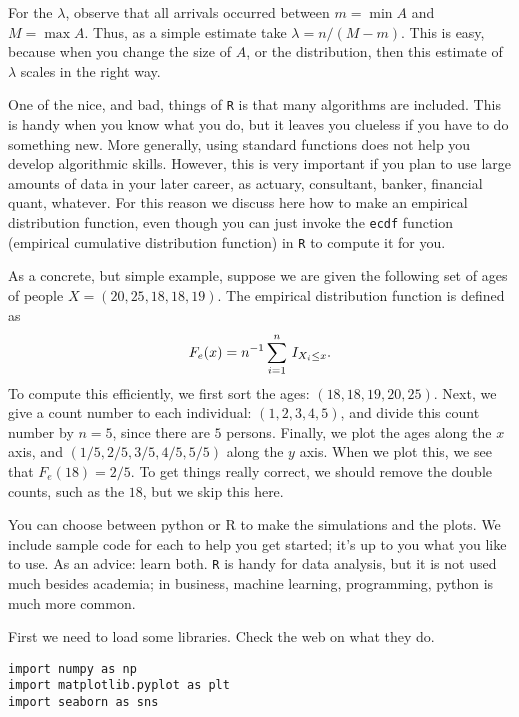 \documentclass[assignments]{subfiles}
\begin{document}
For the \(\lambda\), observe that all arrivals occurred between \(m= \min A\) and \(M=\max A\). Thus, as a simple estimate take \(\lambda = n/(M-m)\). This is easy, because when you change the size of \(A\), or the distribution, then this estimate of \(\lambda\) scales in the right way.


One of the nice, and bad, things of \texttt{R} is that many algorithms are included.
This is handy when you know what you do, but it leaves you clueless  if you have to do something new.
More generally, using standard functions does not help you develop algorithmic skills.
However, this is very important if you plan to use large amounts of data in your later career, as actuary, consultant, banker, financial quant, whatever.
For this reason we discuss here how to make an empirical distribution function, even though you can just invoke the \texttt{ecdf} function (empirical cumulative distribution function) in \texttt{R} to compute it for you.

As a concrete, but simple example, suppose we are given the following set of ages of people \(X = (20, 25, 18, 18, 19)\). The empirical distribution function is defined as
\begin{equation*}
F_e(x) = n^{-1}\sum_{i=1}^n \,I_{X_i\leq x}.
\end{equation*}
To compute this efficiently, we first sort the ages: \((18, 18, 19, 20, 25)\). Next, we give a count number to each individual: \((1,2,3,4,5)\), and divide this count number by \(n=5\), since there are \(5\) persons. Finally, we plot the ages along the \(x\) axis, and \((1/5, 2/5, 3/5, 4/5, 5/5)\) along the \(y\) axis. When we plot this, we see that \(F_{e}(18) = 2/5\). To get things really correct, we should remove the double counts, such as the \(18\), but we skip this here. 


You can choose between  python  or R to make the simulations and the plots.
We include sample code for each to help you get started; it's up to you what you like to use.
As an advice: learn both.
\texttt{R} is handy for data analysis, but it is not used much besides academia; in business, machine learning, programming, python is much more common. 


First we need to load some libraries. Check the web on what they do.


\begin{verbatim}
import numpy as np
import matplotlib.pyplot as plt
import seaborn as sns
\end{verbatim}
\end{document}
